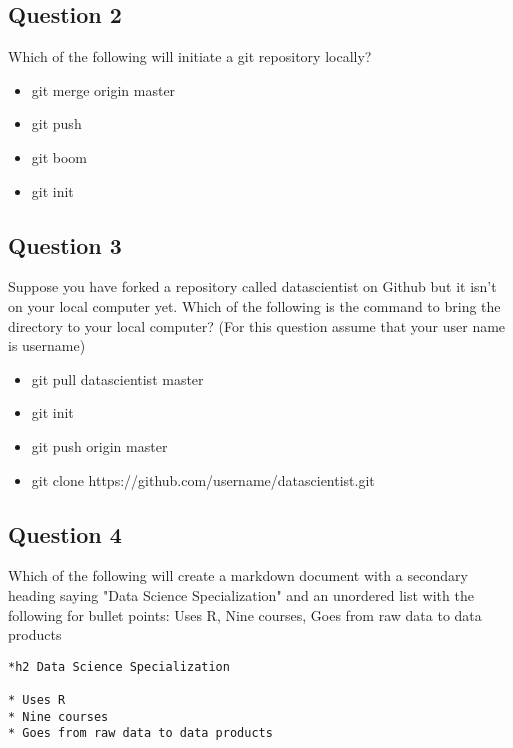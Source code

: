 \documentclass[12pt]{article}
\begin{document}
\subsection*{Question 2}
Which of the following will initiate a git repository locally?

\begin{itemize}
\item git merge origin master
\item git push
\item git boom
\item git init
\end{itemize}
\subsection*{Question 3}
Suppose you have forked a repository called datascientist on Github but it isn't on your local computer yet. Which of the following is the command to bring the directory to your local computer? (For this question assume that your user name is username)

\begin{itemize}
\item git pull datascientist master
\item git init
\item git push origin master
\item git clone https://github.com/username/datascientist.git
\end{itemize}
\subsection*{Question 4}
Which of the following will create a markdown document with a secondary heading saying "Data Science Specialization" and an unordered list with the following for bullet points: Uses R, Nine courses, Goes from raw data to data products
\begin{verbatim}
*h2 Data Science Specialization 

* Uses R 
* Nine courses 
* Goes from raw data to data products
\end{verbatim}
\end{document}
